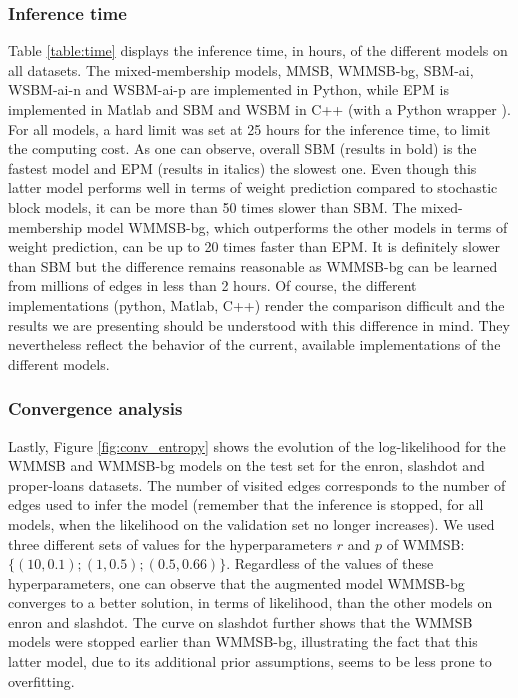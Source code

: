\subsubsection{Inference time} 

\begin{figure*}[t]
\centering
	
    \label{fig:conv_entropy}
\end{figure*}

Table \ref{table:time} displays the inference time, in hours, of the different models on all datasets. The mixed-membership models, MMSB, WMMSB-bg,  SBM-ai, WSBM-ai-n and WSBM-ai-p are implemented in Python, while  EPM is implemented in Matlab and SBM and WSBM in C++ (with a Python wrapper \cite{peixoto_graph-tool_2014}). For all models, a hard limit was set at 25 hours for the inference time, to limit the computing cost. As one can observe, overall SBM (results in bold) is the fastest model and EPM (results in italics) the slowest one. Even though this latter model performs well in terms of weight prediction compared to stochastic block models, it can be more than 50 times slower than SBM. The mixed-membership model WMMSB-bg, which outperforms the other models in terms of weight prediction, can be up to 20 times faster than EPM. It is definitely slower than SBM but the difference remains reasonable as WMMSB-bg can be learned from millions of edges in less than 2 hours. Of course, the different implementations (python, Matlab, C++) render the comparison difficult and the results we are presenting should be understood with this difference in mind. They nevertheless reflect the behavior of the current, available implementations of the different models.

\subsubsection{Convergence analysis} 

Lastly, Figure \ref{fig:conv_entropy} shows the evolution of the log-likelihood for the WMMSB and WMMSB-bg models on the test set for the enron, slashdot and proper-loans datasets. The number of visited edges corresponds to the number of edges used to infer the model (remember that the inference is stopped, for all models, when the likelihood  on the validation set no longer increases). We used three different sets of values for the hyperparameters $r$ and $p$ of WMMSB: $\{(10,0.1); (1,0.5); (0.5,0.66)\}$. Regardless of the values of these hyperparameters, one can observe that the augmented model WMMSB-bg converges to a better solution, in terms of likelihood, than the other models on enron and slashdot. The curve on slashdot further shows that the WMMSB models were stopped earlier than WMMSB-bg, illustrating the fact that this latter model, due to its additional prior assumptions, seems to be less prone to overfitting.









